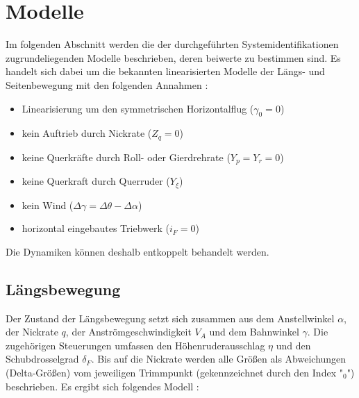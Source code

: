 \chapter{Modelle}

Im folgenden Abschnitt werden die der durchgeführten Systemidentifikationen 
zugrundeliegenden Modelle beschrieben, deren beiwerte zu bestimmen sind. Es 
handelt sich dabei um die bekannten linearisierten Modelle der Längs- und 
Seitenbewegung mit den folgenden Annahmen \cite{Fichter2009}:
\begin{itemize}
	\item Linearisierung um den symmetrischen Horizontalflug ($ \gamma_0=0 $)
	\item kein Auftrieb durch Nickrate ($ Z_q=0 $)
	\item keine Querkräfte durch Roll- oder Gierdrehrate ($ Y_p=Y_r=0 $)
	\item keine Querkraft durch Querruder ($ Y_\xi $)
	\item kein Wind ($ \Delta\gamma = \Delta\theta-\Delta\alpha $)
	\item horizontal eingebautes Triebwerk ($ i_F=0 $)
\end{itemize} 
Die Dynamiken können deshalb entkoppelt behandelt werden. %

\section{Längsbewegung}
Der Zustand der Längsbewegung setzt sich zusammen aus dem Anstellwinkel $ 
\alpha $, der Nickrate $ q $, der Anströmgeschwindigkeit $ V_A $ und dem 
Bahnwinkel $ \gamma $. Die zugehörigen Steuerungen umfassen den 
Höhenruderausschlag $ \eta $ und den Schubdrosselgrad $ \delta_F $. Bis auf die 
Nickrate werden alle Größen als Abweichungen (Delta-Größen) vom jeweiligen 
Trimmpunkt (gekennzeichnet durch den Index "$ _0 $") beschrieben. Es ergibt sich folgendes 
Modell \cite{Fichter2009}:

